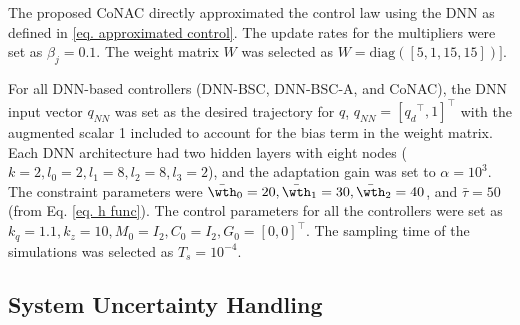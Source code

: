 \documentclass[lettersize,journal]{IEEEtran}
\begin{document}
The proposed CoNAC directly approximated the control law using the DNN as defined in \eqref{eq. approximated control}. The update rates for the multipliers were set as $\beta_{j}=0.1$. The weight matrix $W$ was selected as $W=\text{diag}([5,1,15,15])]$.

For all DNN-based controllers (DNN-BSC, DNN-BSC-A, and CoNAC), the DNN input vector $q_{NN}$ was set as the desired trajectory for ${q}$, \ie $q_{NN}=[{q_d}^\top,1]^\top$ with the augmented scalar 1 included to account for the bias term in the weight matrix. 
Each DNN architecture had two hidden layers with eight nodes (\ie $k=2, l_0=2, l_1=8, l_2=8, l_3=2$), and the adaptation gain was set to $\alpha =10^3$. The constraint parameters were $\bar\wth_0=20, \bar\wth_1=30, \bar\wth_2=40$, and $\bar\tau = 50$ (from Eq. \eqref{eq. h func}). The control parameters for all the controllers were set as ${k_q}=1.1,{k_z}=10,M_0=I_2,C_0=I_2,G_0=[0,0]^\top$.
The sampling time of the simulations was selected as $T_s=10^{-4}$.


\subsection{System Uncertainty Handling}
\end{document}
